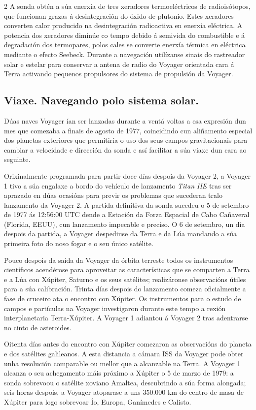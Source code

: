\begin{multicols}{2}
A sonda obtén a súa enerxía de tres xeradores termoeléctricos de radioisótopos,
que funcionan grazas á desintegración do óxido de plutonio. Estes xeradores
converten calor producido na desintegración radioactiva en enerxía eléctrica. A
potencia dos xeradores diminúe co tempo debido á semivida do combustible e á
degradación dos termopares, polos cales se converte enerxía térmica en
eléctrica mediante o efecto Seebeck. Durante a navegación utilízanse sinais do
rastreador solar e estelar para conservar a antena de radio do Voyager
orientada cara á Terra activando pequenos propulsores do sistema de propulsión
da Voyager.

\subsection*{Viaxe. Navegando polo sistema solar.}

Dúas naves Voyager ían ser lanzadas durante a ventá %
voltas a esa expresión dun mes que comezaba a finais de agosto de 1977,
coincidindo cun aliñamento especial  dos planetas exteriores que permitiría o
uso dos seus campos gravitacionais para cambiar a velocidade e dirección da
sonda e así facilitar a súa viaxe dun cara ao seguinte.

Orixinalmente programada para partir doce días despois da Voyager 2, a Voyager
1 tivo a súa engalaxe a bordo do vehículo de lanzamento \textit{Titan IIE} tras
ser aprazado en dúas ocasións para previr os problemas que sucederan tralo
lanzamento da Voyager 2. A partida definitiva da sonda sucedeu o 5 de setembro
de 1977 ás 12:56:00 UTC dende a Estación da Forza Espacial de Cabo Cañaveral
(Florida, EEUU), cun lanzamento impecable e preciso. O 6 de setembro, un día
despois da partida, a Voyager despediuse da Terra e da Lúa mandando a súa
primeira foto do noso fogar e o seu único satélite.

Pouco despois da saída da Voyager da órbita terreste todos os instrumentos
científicos acendérose para aproveitar as características que se comparten a
Terra e a Lúa con Xúpiter, Saturno e os seus satélites; realizáronse
observacións útiles para a súa calibración. Trinta días despois do lanzamento
comeza oficialmente a fase de cruceiro ata o encontro con Xúpiter. Os
instrumentos para o estudo de campos e partículas na Voyager investigaron
durante este tempo a rexión interplanetaria Terra-Xúpiter. A Voyager 1 adiantou
á Voyager 2 tras adentrarse no cinto de asteroides.

Oitenta días antes do encontro con Xúpiter comezaron as observacións do
planeta e dos satélites galileanos. A esta distancia a cámara ISS da Voyager
pode obter unha resolución comparable ou mellor que a alcanzable na Terra. A
Voyager 1 alcanza o seu achegamento máis próximo a Xúpiter o 5 de marzo de
1979: a sonda sobrevoou o satélite xoviano Amaltea, descubrindo a súa forma
alongada; seis horas despois, a Voyager atoparase a uns 350.000 km do centro de
masa de Xúpiter para logo sobrevoar Ío, Europa, Ganímedes e Calisto.


\end{multicols}
